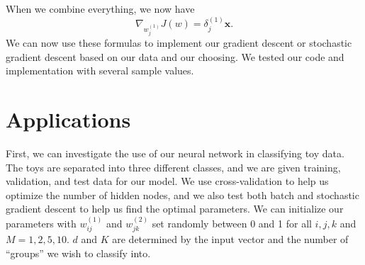 \documentclass[11pt,letterpaper]{article}
\begin{document}
When we combine everything, we now have
$$\nabla_{w^{(1)}_j}J(w)=\delta_j^{(1)}\textbf{x}.$$
We can now use these formulas to implement our gradient descent or stochastic gradient descent based on our data and our choosing. We tested our code and implementation with several sample values.

\section{Applications}
First, we can investigate the use of our neural network in classifying toy data. The toys are separated into three different classes, and we are given training, validation, and test data for our model. We use cross-validation to help us optimize the number of hidden nodes, and we also test both batch and stochastic gradient descent to help us find the optimal parameters. We can initialize our parameters with $w^{(1)}_{ij}$ and $w^{(2)}_{jk}$ set randomly between 0 and 1 for all $i,j,k$ and $M=1,2,5,10$. $d$ and $K$ are determined by the input vector and the number of ``groups'' we wish to classify into.\\
\end{document}

